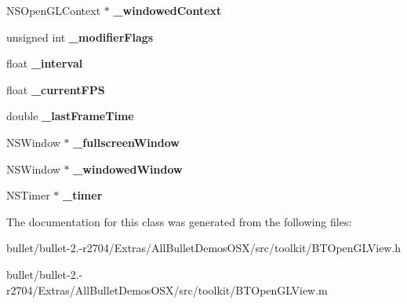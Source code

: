 \begin{DoxyCompactItemize}
\item 
\hypertarget{interface_b_t_open_g_l_view_a8f1833634689a7da55510e1ae9cc53b3}{N\+S\+Open\+G\+L\+Context $\ast$ {\bfseries \+\_\+windowed\+Context}}\label{interface_b_t_open_g_l_view_a8f1833634689a7da55510e1ae9cc53b3}

\item 
\hypertarget{interface_b_t_open_g_l_view_a865fa05c99adf8afa40f3bd221df664d}{unsigned int {\bfseries \+\_\+modifier\+Flags}}\label{interface_b_t_open_g_l_view_a865fa05c99adf8afa40f3bd221df664d}

\item 
\hypertarget{interface_b_t_open_g_l_view_aa6a36e22ff5fe905c348ccf96ec4b528}{float {\bfseries \+\_\+interval}}\label{interface_b_t_open_g_l_view_aa6a36e22ff5fe905c348ccf96ec4b528}

\item 
\hypertarget{interface_b_t_open_g_l_view_a623b730d03da6d0b4973c5fa52028729}{float {\bfseries \+\_\+current\+F\+P\+S}}\label{interface_b_t_open_g_l_view_a623b730d03da6d0b4973c5fa52028729}

\item 
\hypertarget{interface_b_t_open_g_l_view_ab3ac7a5f079fa2dedc9550e50e88f378}{double {\bfseries \+\_\+last\+Frame\+Time}}\label{interface_b_t_open_g_l_view_ab3ac7a5f079fa2dedc9550e50e88f378}

\item 
\hypertarget{interface_b_t_open_g_l_view_a85c6511837d0a568fdf4c0d051f82c44}{N\+S\+Window $\ast$ {\bfseries \+\_\+fullscreen\+Window}}\label{interface_b_t_open_g_l_view_a85c6511837d0a568fdf4c0d051f82c44}

\item 
\hypertarget{interface_b_t_open_g_l_view_a4966ede7c36e6532ee70dfadcbae329b}{N\+S\+Window $\ast$ {\bfseries \+\_\+windowed\+Window}}\label{interface_b_t_open_g_l_view_a4966ede7c36e6532ee70dfadcbae329b}

\item 
\hypertarget{interface_b_t_open_g_l_view_a4ef94ec2735f9f137df2475840f59743}{N\+S\+Timer $\ast$ {\bfseries \+\_\+timer}}\label{interface_b_t_open_g_l_view_a4ef94ec2735f9f137df2475840f59743}

\end{DoxyCompactItemize}


The documentation for this class was generated from the following files\+:\begin{DoxyCompactItemize}
\item 
bullet/bullet-\/2.-\/r2704/\+Extras/\+All\+Bullet\+Demos\+O\+S\+X/src/toolkit/B\+T\+Open\+G\+L\+View.\+h\item 
bullet/bullet-\/2.-\/r2704/\+Extras/\+All\+Bullet\+Demos\+O\+S\+X/src/toolkit/B\+T\+Open\+G\+L\+View.\+m\end{DoxyCompactItemize}

